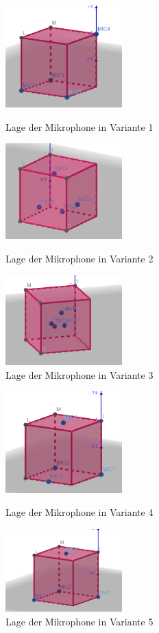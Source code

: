 \begin{figure}

\centering 
\includegraphics[width=0.4\textwidth]{MP1}
\caption{Lage der Mikrophone in Variante 1}\label{fig:Lage der Mikrophone Variante 1}
\includegraphics[width=0.4\textwidth]{MP2}
\caption{Lage der Mikrophone in Variante 2}\label{fig:Lage der Mikrophone in Variante 2}
\includegraphics[width=0.4\textwidth]{MP3}
\caption{Lage der Mikrophone in Variante 3}\label{fig:Lage der Mikrophone in Variante 3}

\end{figure}
\begin{figure}
\centering
\includegraphics[width=0.4\textwidth]{MP4}
\caption{Lage der Mikrophone in Variante 4}\label{fig:Lage der Mikrophone Variante 4}
\centering
\includegraphics[width=0.4\textwidth]{MP5}
\caption{Lage der Mikrophone in Variante 5}\label{fig:Lage der Mikrophone in Variante 5}

\end{figure}
